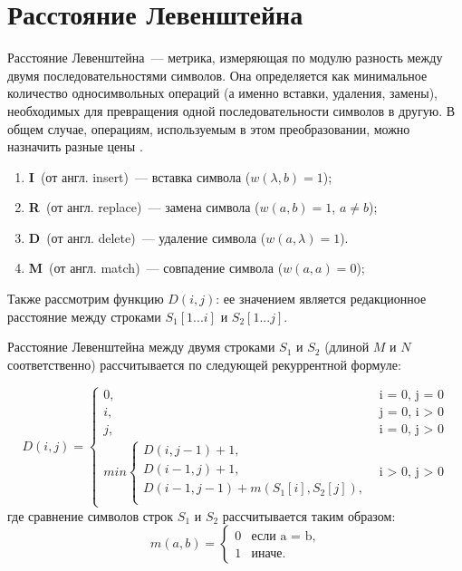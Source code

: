 \section{Расстояние Левенштейна}
Расстояние Левенштейна~--- метрика, измеряющая по модулю разность между двумя последовательностями символов. Она определяется как минимальное количество односимвольных операций (а именно вставки, удаления, замены), необходимых для превращения одной последовательности символов в другую. В общем случае, операциям, используемым в этом преобразовании, можно назначить разные цены \cite{analysis-lev-damlev}.

\begin{enumerate}
    \item \textbf{I}~(от англ. insert)~--- вставка символа ($w(\lambda, b) = 1$);
    \item \textbf{R}~(от англ. replace)~--- замена символа ($w(a, b) = 1$, $a \neq b$);
    \item \textbf{D}~(от англ. delete)~--- удаление символа ($w(a, \lambda) = 1$).
    \item \textbf{M}~(от англ. match)~--- совпадение символа ($w(a, a) = 0$);
\end{enumerate}

Также рассмотрим функцию $D(i, j)$: ее значением является
редакционное расстояние между строками $S_1[1...i]$ и $S_2[1...j]$.

Расстояние Левенштейна между двумя строками $S_{1}$ и $S_{2}$ (длиной $M$ и $N$ соответственно) рассчитывается по следующей рекуррентной формуле:

\begin{equation}
	\label{eq:L}
	D(i, j) =
	\begin{cases}
		0, &\text{i = 0, j = 0}\\
		i, &\text{j = 0, i > 0}\\
		j, &\text{i = 0, j > 0}\\
		min \begin{cases}
			D(i, j - 1) + 1,\\
			D(i - 1, j) + 1,\\
			D(i - 1, j - 1) +  m(S_{1}[i], S_{2}[j]), \\
		\end{cases}
		&\text{i > 0, j > 0}
	\end{cases}
\end{equation}
где сравнение символов строк $S_1$ и $S_2$ рассчитывается таким образом:
\begin{equation}
	\label{eq:m}
	m(a, b) = \begin{cases}
		0 &\text{если a = b,}\\
		1 &\text{иначе.}
	\end{cases}
\end{equation}

